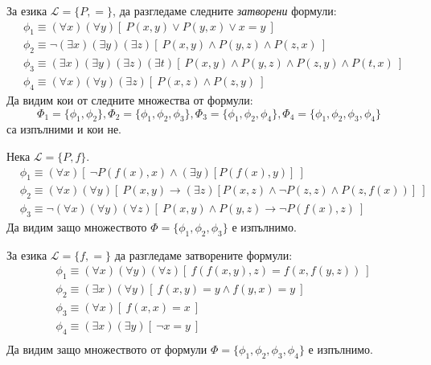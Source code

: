 \begin{example}
  За езика $\mathcal{L} = \{P,=\}$, да разгледаме следните \emph{затворени} формули:
  \begin{align*}
    & \phi_1 \equiv (\forall x)(\forall y)[\ P(x,y) \lor P(y,x) \lor x = y\ ]\\
    & \phi_2 \equiv \neg (\exists x)(\exists y)(\exists z)[\ P(x,y) \land P(y,z) \land P(z,x)\ ]\\
    & \phi_3 \equiv (\exists x)(\exists y)(\exists z)(\exists t)[\ P(x,y) \land P(y,z) \land P(z,y) \land P(t,x)\ ]\\
    & \phi_4 \equiv (\forall x)(\forall y)(\exists z)[\ P(x,z) \land P(z,y)\ ]
  \end{align*}
  Да видим кои от следните множества от формули:
  \[\Phi_1 = \{\phi_1,\phi_2\}, \Phi_2 = \{\phi_1, \phi_2, \phi_3\}, \Phi_3 = \{ \phi_1, \phi_2, \phi_4\}, \Phi_4 = \{\phi_1,\phi_2,\phi_3,\phi_4\}\]
  са изпълними и кои не.
\end{example}

\begin{example}
  Нека $\mathcal{L} = \{P, f\}$.
  \begin{align*}
    & \phi_1 \equiv (\forall x)[\ \neg P(f(x),x) \land (\exists y)[P(f(x),y)]\ ]\\
    & \phi_2 \equiv (\forall x)(\forall y)[\ P(x,y) \to (\exists z)[P(x,z) \land \neg P(z,z) \land P(z,f(x))]\ ]\\
    & \phi_3 \equiv \neg (\forall x)(\forall y)(\forall z)[\ P(x,y) \land P(y,z) \to \neg P(f(x), z)\ ]
  \end{align*}
  Да видим защо множеството $\Phi = \{\phi_1,\phi_2,\phi_3\}$ е изпълнимо.
\end{example}

\begin{example}
  За езика $\mathcal{L} = \{f,=\}$ да разгледаме затворените формули:
  \begin{align*}
    & \phi_1 \equiv (\forall x)(\forall y)(\forall z)[\ f(f(x,y),z) = f(x, f(y,z))\ ]\\
    & \phi_2 \equiv (\exists x)(\forall y)[\ f(x,y) = y \land f(y,x) = y\ ]\\
    & \phi_3 \equiv (\forall x)[\ f(x,x) = x\ ]\\
    & \phi_4 \equiv (\exists x)(\exists y)[\ \neg x = y\ ]\\
  \end{align*}
  Да видим защо множеството от формули $\Phi = \{\phi_1,\phi_2,\phi_3,\phi_4\}$ е изпълнимо.
\end{example}

